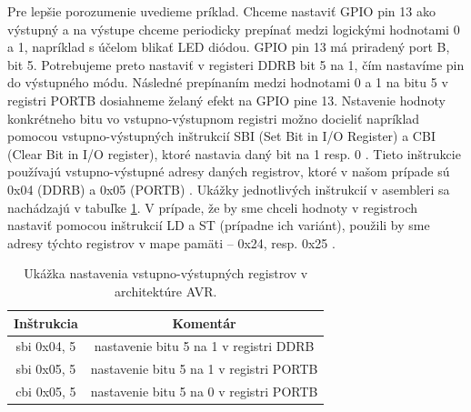 Pre lepšie porozumenie uvedieme príklad. Chceme nastaviť GPIO pin 13 ako výstupný a na výstupe chceme periodicky prepínať medzi logickými hodnotami 0 a 1, napríklad s účelom blikať LED diódou. GPIO pin 13 má priradený port B, bit 5. Potrebujeme preto nastaviť v registeri DDRB bit 5 na 1, čím nastavíme pin do výstupného módu. Následné prepínaním medzi hodnotami 0 a 1 na bitu 5 v registri PORTB dosiahneme želaný efekt na GPIO pine 13. Nstavenie hodnoty konkrétneho bitu vo vstupno-výstupnom registri možno docieliť napríklad pomocou vstupno-výstupných inštrukcií SBI (Set Bit in I/O Register) a CBI (Clear Bit in I/O register), ktoré nastavia daný bit na 1 resp. 0 \cite{avrInstruction}. Tieto inštrukcie používajú vstupno-výstupné adresy daných registrov, ktoré v našom prípade sú 0x04 (DDRB) a 0x05 (PORTB) \cite{atmegaData}. Ukážky jednotlivých inštrukcií v asembleri sa nachádzajú v tabuľke \ref{tab:ovladanieVV}. V prípade, že by sme chceli hodnoty v registroch nastaviť pomocou inštrukcií LD a ST (prípadne ich variánt), použili by sme adresy týchto registrov v mape pamäti -- 0x24, resp. 0x25 \cite{atmegaData}.

\begin{table}
    \caption[Ukážka nastavenia vstupno-výstupných registrov v architektúre AVR.]{Ukážka nastavenia vstupno-výstupných registrov v architektúre AVR.}
    \label{tab:ovladanieVV}
    \begin{center}
    \begin{tabular}{|c|c|}
        \hline 
        Inštrukcia & Komentár \\
        \hline
        sbi 0x04, 5 & nastavenie bitu 5 na 1 v registri DDRB \\
        \hline
        sbi 0x05, 5 & nastavenie bitu 5 na 1 v registri PORTB \\
        \hline
        cbi 0x05, 5 & nastavenie bitu 5 na 0 v registri PORTB \\
        \hline
    \end{tabular}
    \end{center}
\end{table}

